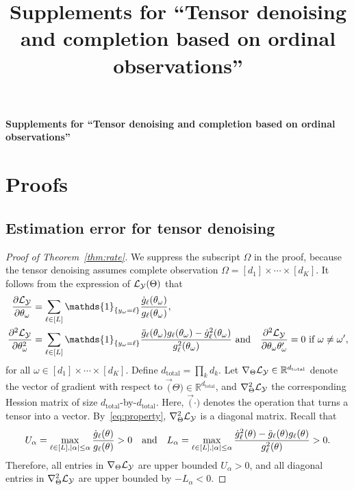 \documentclass[11pt]{article}
\title{Supplements for ``Tensor denoising and completion based on ordinal observations''}
\theoremstyle{plain}
\theoremstyle{definition}
\begin{document}
\begin{center}
\begin{spacing}{1.5}
\textbf{\Large Supplements for ``Tensor denoising and completion based on ordinal observations''}
\end{spacing}
\end{center}

\section{Proofs}
\subsection{Estimation error for tensor denoising}
\begin{proof}[Proof of Theorem~\ref{thm:rate}]
We suppress the subscript $\Omega$ in the proof, because the tensor denoising assumes complete observation $\Omega=[d_1]\times \cdots \times [d_K]$. It follows from the expression of $\mathcal{L}_{\mathcal{Y}}(\Theta)$ that
\begin{align}\label{eq:property}
{\partial \flogl\over \partial \theta_\omega}&=\sum_{\ell\in[L]}\mathds{1}_{\{y_{\omega}=\ell\}}
{\dot{g}_\ell(\theta_\omega)\over g_\ell(\theta_\omega)},\notag\\
{\partial^2 \flogl\over \partial \theta_\omega^2}&=\sum_{\ell\in[L]}\mathds{1}_{\{y_\omega=\ell\}}{\ddot{g}_\ell(\theta_\omega)g_\ell(\theta_\omega)-\dot{g}^2_\ell(\theta_\omega)\over g^2_\ell(\theta_\omega)}\ \text{and}\quad
{\partial^2 \flogl\over \partial \theta_\omega \theta_\omega'}=0\ \text{if}\ \omega\neq \omega',
\end{align}
for all $\omega\in[d_1]\times \cdots \times [d_K]$. 
Define $d_{\text{total}}=\prod_k d_k$. Let $\nabla_{\Theta}\mathcal{L}_{\mathcal{Y}}\in\mathbb{R}^{d_\text{total}}$ denote the vector of gradient with respect to $\Vec(\Theta)\in\mathbb{R}^{d_{\text{total}}}$, and $\nabla^2_{\Theta}\mathcal{L}_{\mathcal{Y}}$ the corresponding Hession matrix of size $d_\text{total}$-by-$d_{\text{total}}$. Here, $\Vec(\cdot)$ denotes the operation that turns a tensor into a vector. By~\eqref{eq:property}, $\nabla^2_{\Theta}\mathcal{L}_{\mathcal{Y}}$ is a diagonal matrix. Recall that
\[
U_\alpha=\max_{\ell\in[L],|\alpha|\leq \alpha}{\dot{g}_\ell(\theta)\over g_\ell(\theta)}>0 \quad \text{and}\quad
L_\alpha=\max_{\ell\in[L],|\alpha|\leq \alpha} {\dot{g}^2_\ell(\theta)-\ddot{g}_\ell(\theta)g_\ell(\theta)\over g^2_\ell(\theta)}>0. 
\]
Therefore, all entries in $\nabla_{\Theta}\mathcal{L}_{\mathcal{Y}}$ are upper bounded $U_\alpha>0$, and all diagonal entries in $\nabla^2_{\Theta}\mathcal{L}_{\mathcal{Y}}$ are upper bounded by $-L_{\alpha}<0$. 


\end{proof}
\end{document}

